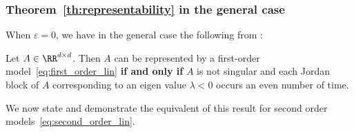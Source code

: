 \documentclass{article}
\begin{document}
\subsubsection{Theorem~\ref{th:representability} in the general case}

When $\varepsilon = 0$, we have in the general case the following from \citet{culver1966existence}:

Let $A \in \RR^{d \times d}$. Then $A$ can be represented by a first-order model~\eqref{eq:first_order_lin} \textbf{if and only if} $A$ is not singular and each Jordan block of $A$ corresponding to an eigen value  $\lambda < 0$ occurs an even number of time. 

We now state and demonstrate the equivalent of this result for second order models~\eqref{eq:second_order_lin}.
\end{document}
